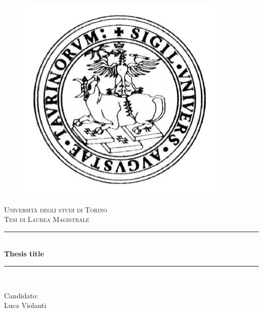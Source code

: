 \documentclass[a4paper, 11pt, oneside]{article}
\newcommand{\HRule}{\rule{\linewidth}{0.5mm}}
\begin{document}

\begin{titlepage}
\begin{center}

\begin{figure}[htp]
\centering
\includegraphics[scale=0.25]{img/logo_unito.png}
\label{}
\end{figure}

\textsc{\LARGE Università degli studi di Torino}\\[2cm]
\textsc{\Large Tesi di Laurea Magistrale}\\[2cm]

\HRule \\[0.4cm]
{ \huge \bfseries Thesis title}\\[0.2cm]
\HRule \\[3cm]

\begin{flushleft}
{\Large
Candidato:\\[0.5cm]
Luca Violanti}
\end{flushleft}

\end{center}
\end{titlepage}


\begin{abstract}
\end{abstract}
\end{document}
